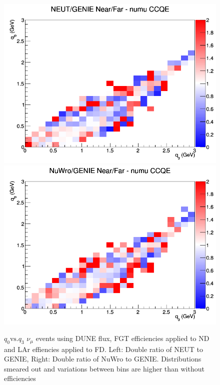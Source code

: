 \documentclass[12pt]{article}
\begin{document}
\begin{figure}[h]
\centering
{}
\includegraphics[width=\linewidth]{eff_q0_q3/FGT/ratios/CCQE_NEUT_GENIE_numu_NF_q3_q0.png}
\endminipage
{}
\includegraphics[width=\linewidth]{eff_q0_q3/FGT/ratios/CCQE_NuWro_GENIE_numu_NF_q3_q0.png}
\endminipage
\caption{$q_0 \textrm{vs.} q_3$ $\nu_{\mu}$ events using DUNE flux, FGT efficiencies applied to ND and LAr effiencies applied to FD. Left: Double ratio of NEUT to GENIE, Right: Double ratio of NuWro to GENIE. Distributions smeared out and variations between bins are higher than without efficiencies}
\label{fig:q0q3_numu_CCQE_FGT_eff}
\end{figure}
\FloatBarrier
\end{document}
